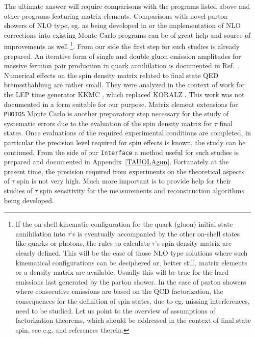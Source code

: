 \documentclass[]{Tauola_interface_design}
\begin{document}
The ultimate answer will require comparisons with the programs listed above 
and other programs featuring matrix elements. 
Comparisons with novel  parton showers of NLO type, eg. as being developed 
in \cite{Jadach:2010ew} or the implementation of NLO corrections into existing 
Monte Carlo programs \cite{Frixione:2010ra,Alioli:2010xd} can  be of great help and source of improvements as well%
\footnote{
If the on-shell kinematic configuration for the quark (gluon) initial state  annihilation into 
$\tau$'s is eventually accompanied by the other on-shell states like quarks or photons, the 
rules to calculate $\tau$'s spin 
density matrix are clearly defined. This will be the case of those NLO type solutions
where such kinematical configurations can be deciphered or, better still, matrix elements
or a density matrix are available. Usually this will be true for the hard emissions  last 
generated by the parton shower. In the  case of parton showers where consecutive emissions are based on the QCD
factorization, the consequences for the  definition of spin states, due to eg. missing interferences,
need to be studied. Let us point to the overview of assumptions 
of factorization theorems, which should be addressed in the context of final
state spin, see e.g. \cite{Efremov:2009dx} and references therein.}.
 From our side the first step for such studies is already prepared. 
An iterative  form of single and double 
gluon emission amplitudes for massive fermion pair 
production in quark annihilation is documented in Ref.~\cite{vanHameren:2008dy}.
Numerical effects on the spin density matrix related to final state QED 
bremssthahlung are rather small. They 
were   analyzed in the context of work for the LEP time 
generator KKMC \cite{kkcpc:1999}, which replaced KORALZ \cite{koralz4:1994}. 
This work
was not documented in a form suitable for our purpose. 
Matrix element extensions for {\tt PHOTOS} Monte Carlo \cite{photosC++} 
is another preparatory 
step necessary for the study of systematic errors due to the evaluation of 
the spin density matrix for $\tau$ final states.
Once evaluations of the required experimental conditions are completed,
in particular the precision level required for 
spin effects is known, the study can be continued. 
From the side of our 
{\tt Interface} a method useful 
 for such studies is  prepared and 
documented in Appendix~\ref{TAUOLAgun}.
Fortunately at the present time, the precision 
required from experiments on the theoretical aspects of $\tau$
spin  is not very high. 
Much more important is to provide help for their studies of $\tau$ spin 
sensitivity  for the  measurements and  reconstruction algorithms being developed.
\end{document}
